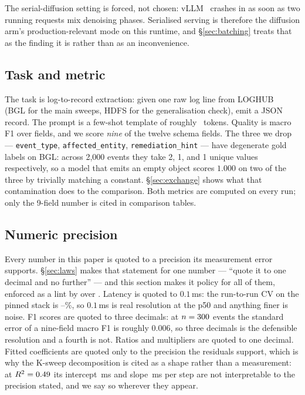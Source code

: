 The serial-diffusion setting is forced, not chosen: vLLM \vllmVersion\ crashes
in  as soon as two running requests mix
denoising phases. Serialised serving is therefore the diffusion arm's
production-relevant mode on this runtime, and \S\ref{sec:batching} treats that
as the finding it is rather than as an inconvenience.

\subsection{Task and metric}

The task is log-to-record extraction: given one raw log line from
LOGHUB~\cite{loghub} (BGL for the main sweeps, HDFS for the generalisation
check), emit a JSON record. The prompt is a few-shot template of roughly \ tokens.
Quality is macro F1 over fields, and we score \emph{nine} of the twelve
schema fields. The three we drop --- \texttt{event\_type},
\texttt{affected\_entity}, \texttt{remediation\_hint} --- have degenerate gold
labels on BGL: across 2{,}000 events they take 2, 1, and 1 unique values
respectively, so a model that emits an empty object scores $1.000$ on two of
the three by trivially matching a constant. \S\ref{sec:exchange} shows what
that contamination does to the comparison. Both metrics are computed on every
run; only the 9-field number is cited in comparison tables.

\subsection{Numeric precision}

Every number in this paper is quoted to a precision its measurement error
supports. \S\ref{sec:laws} makes that statement for one number --- ``quote it
to one decimal and no further'' --- and this section makes it policy for all of
them, enforced as a lint by  over
. Latency is quoted to $0.1$\,ms: the run-to-run CV on the
pinned stack is \arCV--\dgCV\%, so $0.1$\,ms is real resolution at the p50 and
anything finer is noise. F1 scores are quoted to three decimals: at
$n = 300$ events the standard error of a nine-field macro F1 is roughly
$0.006$, so three decimals is the defensible resolution and a fourth is not.
Ratios and multipliers are quoted to one decimal. Fitted coefficients are
quoted only to the precision the residuals support, which is why the K-sweep
decomposition is cited as a shape rather than a measurement: at $R^2 =
0.49$ its intercept \kfitBase\,ms and slope \kfitSlope\,ms per step are
not interpretable to the precision stated, and we say so wherever they appear.

